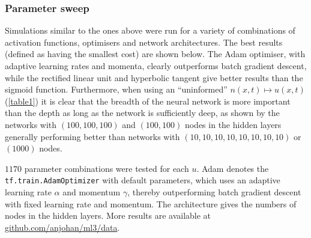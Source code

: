 \documentclass[11pt,british,a4paper]{article}
\numberwithin{equation}{section}
\begin{document}
\subsubsection{Parameter sweep}
Simulations similar to the ones above were run for a variety of combinations of activation functions, optimisers and network architectures. The best results (defined as having the smallest cost) are shown below. The Adam optimiser, with adaptive learning rates and momenta, clearly outperforms batch gradient descent, while the rectified linear unit and hyperbolic tangent give better results than the sigmoid function. Furthermore, when using an ``uninformed'' \(n(x,t) \mapsto u(x,t)\) (\vref*{table1}) it is clear that the breadth of the neural network is more important than the depth as long as the network is sufficiently deep, as shown by the networks with \((100,100,100)\) and \((100,100)\) nodes in the hidden layers generally performing better than networks with \((10,10,10,10,10,10,10,10)\) or \((1000)\) nodes.

\(\num{1170}\) parameter combinations were tested for each \(u\). Adam denotes the \lstinline{tf.train.AdamOptimizer} with default parameters, which uses an adaptive learning rate \(\alpha\) and momentum \(\gamma\), thereby outperforming batch gradient descent with fixed learning rate and momentum. The architecture gives the numbers of nodes in the hidden layers. More results are available at \href{https://github.com/anjohan/ml3/tree/master/data}{github.com/anjohan/ml3/data}.
\begin{table}[H]
    \centering
    \caption{\(u(x,t) = \sin(\pi x) + tx\qty(1-x)u(x,t)\).}\label{table1}
\end{table}
\begin{table}[H]
    \centering
    \caption{\(u(x,t) = \sin(\pi x)\qty(1 + tu(x,t))\).}
\end{table}
\end{document}
